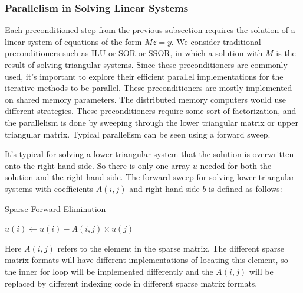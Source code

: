 \subsubsection{Parallelism in Solving Linear Systems}
Each preconditioned step from the previous subsection requires the solution of a linear system of equations of the form $Mz = y$. We consider traditional preconditioners such as ILU or SOR or SSOR, in which a solution with $M$ is the result of solving triangular systems. Since these preconditioners are commonly used, it's important to explore their efficient parallel implementations for the iterative methods to be parallel. These preconditioners are mostly implemented on shared memory parameters. The distributed memory computers would use different strategies. These preconditioners require some sort of factorization, and the parallelism is done by sweeping through the lower triangular matrix or upper triangular matrix. Typical parallelism can be seen using a forward sweep. 

It's typical for solving a lower triangular system that the solution is overwritten onto the right-hand side. So there is only one array $u$ needed for both the solution and the right-hand side. The forward sweep for solving lower triangular systems with coefficients $A(i,j)$ and right-hand-side $b$ is defined as follows:
\begin{algorithm}
\caption{Sparse Forward Elimination}\label{alg:two}
\begin{algorithmic}[1]
            \State $u(i) \gets u(i) - A(i,j) \times u(j)$
        \EndFor
    \EndFor
\end{algorithmic}
\end{algorithm}

Here $A(i,j)$ refers to the element in the sparse matrix. The different sparse matrix formats will have different implementations of locating this element, so the inner for loop will be implemented differently and the $A(i,j)$ will be replaced by different indexing code in different sparse matrix formats.

